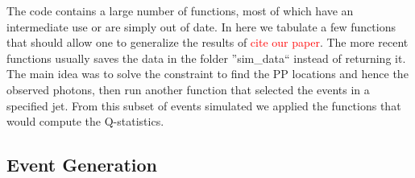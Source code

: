 \documentclass[article, superscriptaddress, ctexart, nofootinbib]{revtex4}
\newcommand{\tcr}{\textcolor{red}}
\begin{document}
The code contains a large number of functions, most of which have an intermediate use or are simply out of date. In here we tabulate a few functions that should allow one to generalize the
results of \tcr{cite our paper}. The more recent functions usually saves the data in the folder ''sim\_data`` instead of returning it.\\

The main idea was to solve the constraint to find the PP locations and hence the observed photons, then run another function that selected the events in a specified jet.
From this subset of events simulated we applied the functions that would compute the Q-statistics.

\subsection{Event Generation}
\end{document}
